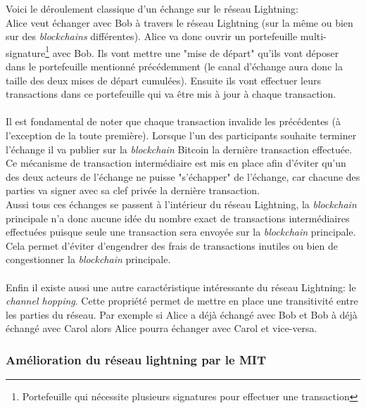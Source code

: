 Voici le déroulement classique d'un échange sur le réseau Lightning:\\ Alice veut échanger avec Bob à travers le réseau Lightning (sur la même ou bien sur des \textit{\gls{blockchain}s} différentes). 
Alice va donc ouvrir un portefeuille multi-signature\footnote{Portefeuille qui nécessite plusieurs signatures pour effectuer une transaction} avec Bob. Ils vont mettre une "mise de départ" qu'ils vont déposer dans le portefeuille mentionné précédemment (le canal d'échange aura donc la taille des deux mises de départ cumulées).
Ensuite ils vont effectuer leurs transactions dans ce portefeuille qui va être mis à jour à chaque transaction.\\ \\ 
Il est fondamental de noter que chaque transaction invalide les précédentes (à l'exception de la toute première). Lorsque l'un des participants souhaite terminer l'échange il va publier sur la \textit{\gls{blockchain}} \gls{Bitcoin} la dernière transaction effectuée.
Ce mécanisme de transaction intermédiaire est mis en place afin d'éviter qu'un des deux acteurs de l'échange ne puisse "s'échapper" de l'échange, car chacune des parties va signer avec sa clef privée la dernière transaction. \\
Aussi tous ces échanges se passent à l'intérieur du réseau Lightning, la \textit{\gls{blockchain}} principale n'a donc aucune idée du nombre exact de transactions intermédiaires effectuées puisque seule une transaction sera envoyée sur la \textit{\gls{blockchain}} principale. 
Cela permet d'éviter d'engendrer des frais de transactions inutiles ou bien de congestionner la \textit{\gls{blockchain}} principale.\\ \\
 Enfin il existe aussi une autre caractéristique intéressante du réseau Lightning: le \textit{channel hopping}. 
Cette propriété permet de mettre en place une transitivité entre les parties du réseau. Par exemple si Alice a déjà échangé avec Bob et Bob à déjà échangé avec Carol alors Alice pourra échanger avec Carol et vice-versa. 


\subsubsection{Amélioration du réseau lightning par le MIT}

